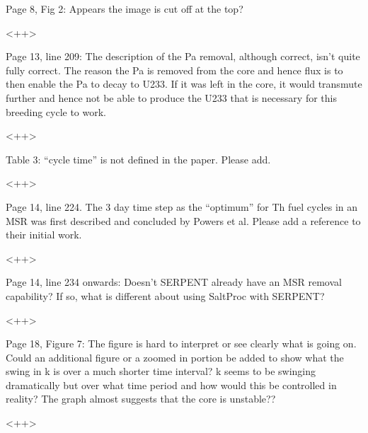 \documentclass[answers,11pt]{exam}
\begin{document}
\begin{questions}
        \question  Page 8, Fig 2: Appears the image is cut off at the top?
        \begin{solution}
                <++>
        \end{solution}

        \question  Page 13, line 209: The description of the Pa removal, 
        although correct, isn't quite fully correct. The reason the Pa is 
        removed from the core and hence flux is to then enable the Pa to decay 
        to U233. If it was left in the core, it would transmute further and 
        hence not be able to produce the U233 that is necessary for this 
        breeding cycle to work.
        \begin{solution}
                <++>
        \end{solution}

        \question  Table 3: ``cycle time'' is not defined in the paper. Please 
        add.
        \begin{solution}
                <++>
        \end{solution}

        \question  Page 14, line 224. The 3 day time step as the ``optimum'' for 
        Th fuel cycles in an MSR was first described and concluded by Powers et 
        al. Please add a reference to their initial work.
        \begin{solution}
                <++>
        \end{solution}

        \question  Page 14, line 234 onwards: Doesn't SERPENT already have an 
        MSR removal capability? If so, what is different about using SaltProc 
        with SERPENT?
        \begin{solution}
                <++>
        \end{solution}

        \question  Page 18, Figure 7: The figure is hard to interpret or see 
        clearly what is going on. Could an additional figure or a zoomed in 
        portion be added to show what the swing in k is over a much shorter 
        time interval? k seems to be swinging dramatically but over what time 
        period and how would this be controlled in reality? The graph almost 
        suggests that the core is unstable??
        \begin{solution}
                <++>
        \end{solution}


\end{questions}
\end{document}
